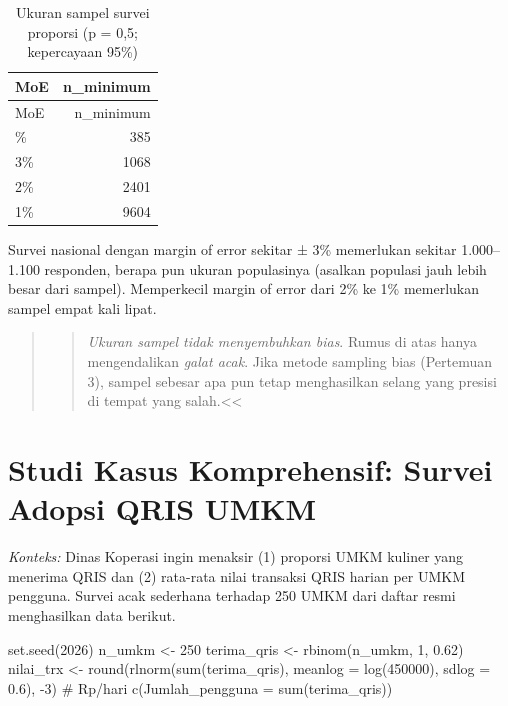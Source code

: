 \documentclass[
  indonesian,
  letterpaper,
]{book}
\newenvironment{Shaded}{\begin{snugshade}}{\end{snugshade}}
\newcommand{\AttributeTok}[1]{\textcolor[rgb]{0.40,0.45,0.13}{#1}}
\newcommand{\CommentTok}[1]{\textcolor[rgb]{0.37,0.37,0.37}{#1}}
\newcommand{\DecValTok}[1]{\textcolor[rgb]{0.68,0.00,0.00}{#1}}
\newcommand{\FloatTok}[1]{\textcolor[rgb]{0.68,0.00,0.00}{#1}}
\newcommand{\FunctionTok}[1]{\textcolor[rgb]{0.28,0.35,0.67}{#1}}
\newcommand{\NormalTok}[1]{\textcolor[rgb]{0.00,0.23,0.31}{#1}}
\newcommand{\OtherTok}[1]{\textcolor[rgb]{0.00,0.23,0.31}{#1}}
\newcommand{\SpecialCharTok}[1]{\textcolor[rgb]{0.37,0.37,0.37}{#1}}
\begin{document}
\begin{longtable}[]{@{}lr@{}}
\caption{Ukuran sampel survei proporsi (p = 0,5; kepercayaan
95\%)}\tabularnewline
\toprule\noalign{}
MoE & n\_minimum \\
\midrule\noalign{}
\endfirsthead
\toprule\noalign{}
MoE & n\_minimum \\
\midrule\noalign{}
\endhead
\bottomrule\noalign{}
\endlastfoot
5\% & 385 \\
3\% & 1068 \\
2\% & 2401 \\
1\% & 9604 \\
\end{longtable}

Survei nasional dengan margin of error sekitar ± 3\% memerlukan sekitar
1.000--1.100 responden, berapa pun ukuran populasinya (asalkan populasi
jauh lebih besar dari sampel). Memperkecil margin of error dari 2\% ke
1\% memerlukan sampel empat kali lipat.

\begin{quote}
\begin{quote}
\emph{Ukuran sampel tidak menyembuhkan bias}. Rumus di atas hanya
mengendalikan \emph{galat acak}. Jika metode sampling bias (Pertemuan
3), sampel sebesar apa pun tetap menghasilkan selang yang presisi di
tempat yang salah.\textless\textless{}
\end{quote}
\end{quote}


\chapter{Studi Kasus Komprehensif: Survei Adopsi QRIS
UMKM}\label{studi-kasus-komprehensif-survei-adopsi-qris-umkm}

\emph{Konteks:} Dinas Koperasi ingin menaksir (1) proporsi UMKM kuliner
yang menerima QRIS dan (2) rata-rata nilai transaksi QRIS harian per
UMKM pengguna. Survei acak sederhana terhadap 250 UMKM dari daftar resmi
menghasilkan data berikut.

\begin{Shaded}
\begin{Highlighting}[]
\FunctionTok{set.seed}\NormalTok{(}\DecValTok{2026}\NormalTok{)}
\NormalTok{n\_umkm }\OtherTok{\textless{}{-}} \DecValTok{250}
\NormalTok{terima\_qris }\OtherTok{\textless{}{-}} \FunctionTok{rbinom}\NormalTok{(n\_umkm, }\DecValTok{1}\NormalTok{, }\FloatTok{0.62}\NormalTok{)}
\NormalTok{nilai\_trx }\OtherTok{\textless{}{-}} \FunctionTok{round}\NormalTok{(}\FunctionTok{rlnorm}\NormalTok{(}\FunctionTok{sum}\NormalTok{(terima\_qris), }\AttributeTok{meanlog =} \FunctionTok{log}\NormalTok{(}\DecValTok{450000}\NormalTok{), }\AttributeTok{sdlog =} \FloatTok{0.6}\NormalTok{),}
\SpecialCharTok{{-}}\DecValTok{3}\NormalTok{) }\CommentTok{\# Rp/hari}
\FunctionTok{c}\NormalTok{(}\AttributeTok{Jumlah\_pengguna =} \FunctionTok{sum}\NormalTok{(terima\_qris))}
\end{Highlighting}
\end{Shaded}
\end{document}
